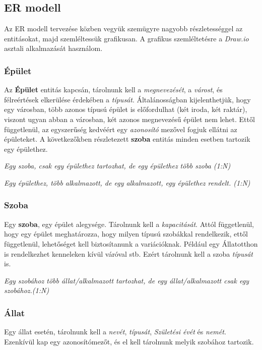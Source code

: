 \documentclass[a4paper,12pt]{article}
\begin{document}
\subsection{ER modell}
Az ER modell tervezése közben vegyük szemügyre nagyobb részletességgel az entitásokat, majd szemléltessük grafikusan. A grafikus szemléltetésre a \textit{Draw.io} asztali alkalmazását használom.

\subsubsection*{Épület}

Az \textbf{Épület} entitás kapcsán, tárolnunk kell a \textit{megnevezését}, a \textit{várost}, és félreértések elkerülése érdekében a \textit{típusát}. Általánosságban kijelenthetjük, hogy egy városban, több azonos típusú épület is előfordulhat (két iroda, két raktár), viszont ugyan abban a városban, két azonos megnevezésű épület nem lehet. Ettől függetlenül, az egyszerűség kedvéért egy \textit{azonosító} mezővel fogjuk ellátni az épületeket. A következőkben részletezett \textbf{szoba} entitás minden esetben tartozik egy épülethez.


\begin{center}
	{\small \textit{Egy szoba, csak egy épülethez tartozhat, de egy épülethez több szoba \textit{(1:N)}}}

	{\small \textit{Egy épülethez, több alkalmazott, de egy alkalmazott, egy épülethez rendelt. \textit{(1:N)}}}
\end{center}

\subsubsection*{Szoba}

Egy \textbf{szoba}, egy épület alegysége. Tárolnunk kell a \textit{kapacitását}. Attól függetlenül, hogy egy épület meghatározza, hogy milyen típusú szobákkal rendelkezik, ettől függetlenül, lehetőséget kell biztosítanunk a variációknak. Például egy Állatotthon is rendelkezhet kenneleken kívül váróval stb. Ezért tárolnunk kell a szoba \textit{típusát} is.

\begin{center}
	\textit{{\small Egy szobához több állat/alkalmazott tartozhat, de egy állat/alkalmazott csak egy szobához.\textit{(1:N)}}}
\end{center}

\subsubsection{Állat}
Egy állat esetén, tárolnunk kell a \textit{nevét}, \textit{típusát}, \textit{Születési évét} és \textit{nemét}.
Ezenkívül kap egy azonosítómezőt, és el kell tárolnunk melyik szobához tartozik.
\end{document}

